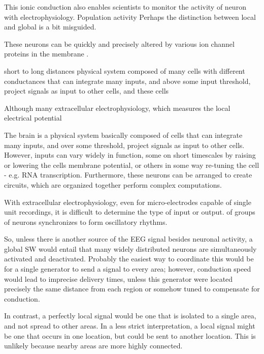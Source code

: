 This ionic conduction also enables scientists to monitor the activity of neuron with electrophysiology. Population activity 
Perhaps the distinction between local and global is a bit misguided. 

These neurons can be quickly and precisely altered by various ion channel proteins in the membrane .  

short to long distances  physical system composed of many cells with different conductances that can integrate many inputs, and above some input threshold, project signals as input to other cells, and these cells 

Although many extracellular electrophysiology, which measures the local electrical potential 

The brain is a physical system basically composed of cells that can integrate many inputs, and over some threshold, project signals as input to other cells. However, inputs can vary widely in function, some on short timescales by raising or lowering the cells membrane potential, or others in some way re-tuning the cell - e.g. RNA transcription. Furthermore, these neurons can be arranged to create circuits, which are organized together perform complex computations.

With extracellular electrophysiology, even for micro-electrodes capable of single unit recordings, it is difficult to determine the type of input or output. 
 of groups of neurons synchronizes to form oscillatory rhythms. 

So, unless there is another source of the EEG signal besides neuronal activity, a global SW would entail that many widely distributed neurons are simultaneously activated and deactivated. Probably the easiest way to coordinate this would be for a single generator to send a signal to every area; however, conduction speed would lead to imprecise delivery times, unless this generator were located precisely the same distance from each region or somehow tuned to compensate for conduction.

In contrast, a perfectly local signal would be one that is isolated to a single area, and not spread to other areas. In a less strict interpretation, a local signal might be one that occurs in one location, but could be sent to another location. This is unlikely because nearby areas are more highly connected.

